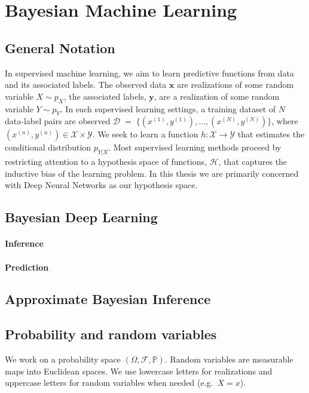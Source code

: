 \section{Bayesian Machine Learning}
\label{sec:bml}

\subsection{General Notation}
In supervised machine learning, we aim to learn predictive functions from data and its associated labels. The observed data $\bm{x}$ are realizations of some random variable $X \sim p_X$, the associated labels, $\bm{y}$, are a realization of some random variable $Y \sim p_Y$. In such supervised learning settings, a training dataset of $N$ data-label pairs are observed $\mathcal{D} \;=\; \{(x^{(1)},y^{(1)}),\dots,(x^{(N)},y^{(N)})\}$, where $(x^{(n)},y^{(n)})\in \mathcal{X}\times\mathcal{Y}$. We seek to learn a function $h: \mathcal{X} \rightarrow \mathcal{Y}$ that estimates the conditional distribution $p_{Y|X}$. Most supervised learning methods proceed by restricting attention to a hypothesis space of functions, $\mathcal{H}$,  that captures the inductive bias of the learning problem. In this thesis we are primarily concerned with Deep Neural Networks as our hypothesis space. 

\subsection{Bayesian Deep Learning}

\paragraph{Inference}

\paragraph{Prediction}
\subsection{Approximate Bayesian Inference}

\subsection{Probability and random variables}
We work on a probability space $(\Omega,\mathcal{F},\mathbb{P})$.
Random variables are measurable maps into Euclidean spaces.
We use lowercase letters for realizations and uppercase letters for random variables when needed (e.g.\ $X=x$).

